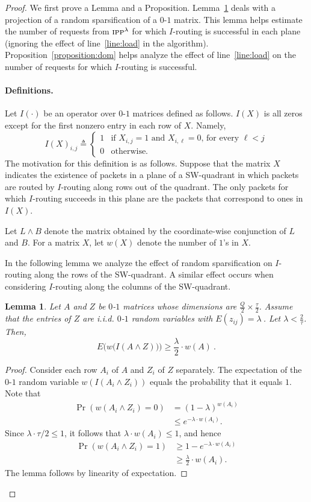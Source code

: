 \documentclass[11pt]{article}
\newtheorem{lemma}[theorem]{Lemma}
\newcommand{\eqdf}{\triangleq}
\newenvironment{proof sketch}[1]{\noindent {\emph{Proof sketch of #1:}}}{\hfill \qed}
\newcommand{\hl}{\tau}
\newcommand{\vl}{Q}
\begin{document}
\begin{proof}
  We first prove a Lemma and a Proposition. Lemma~\ref{lemma:sparse} deals with a
  projection of a random sparsification of a $0$-$1$ matrix. This
  lemma helps estimate the number of requests from $\text{\sc{ipp}}^{\lambda}$ for which
  $I$-routing is successful in each plane (ignoring the effect of
  line~\ref{line:load} in the algorithm).
Proposition~\ref{proposition:dom} helps analyze the effect of
  line~\ref{line:load} on the number of requests for which
  $I$-routing is successful.

\paragraph{Definitions.}

Let $I(\cdot)$ be an operator over $0$-$1$ matrices defined as follows. $I(X)$ is all
zeros except for the first nonzero entry in each row of $X$. Namely,
\[
I(X)_{i,j} \eqdf
\begin{cases}
  1 &\text{if $X_{i,j}=1$ and $X_{i,\ell}=0$, for every $\ell<j$}\\
0&\text{otherwise.}
\end{cases}
\]
The motivation for this definition is as follows. Suppose
that the matrix $X$ indicates the existence of packets in a
plane of a SW-quadrant in which packets are routed by
$I$-routing along rows out of the quadrant. The only
packets for which $I$-routing succeeds in this plane are
the packets that correspond to ones in $I(X)$.

Let $L\wedge B$ denote the matrix obtained by the coordinate-wise
conjunction of $L$ and $B$. For a matrix $X$, let $w(X)$ denote the number of
$1$'s in $X$.

In the following lemma we analyze the effect of random sparsification on $I$-routing along the rows of the SW-quadrant.
A similar effect occurs when considering $I$-routing along the columns of the SW-quadrant.
\begin{lemma}\label{lemma:sparse}
  Let $A$ and $Z$ be $0$-$1$ matrices whose dimensions are $\frac{\vl}{2} \times \frac{\hl}{2}$. Assume that the entries of $Z$ are i.i.d. $0$-$1$
  random variables with $E(z_{ij})=\lambda\:$.  Let $\lambda < \frac
  {2}{\hl}$. Then,
  $$E\Big(w\big(I(A \wedge Z)\big)\Big) \geq \frac{\lambda}{2} \cdot w(A)\:.$$
\end{lemma}
\begin{proof}
  Consider each row $A_i$ of $A$ and $Z_i$ of $Z$ separately.  The expectation of the
  $0$-$1$ random variable $w(I(A_i \wedge Z_i))$ equals the probability that it equals $1$.
  Note that
\begin{align*}
  \Pr(w(A_i\wedge Z_i)=0)&=(1-\lambda)^{w(A_i)}\\
&\leq e^{-\lambda \cdot w(A_i)}.
\end{align*}
Since $\lambda \cdot \tau/2 \leq 1$, it follows that $\lambda \cdot w(A_i)\leq 1$,
and hence
\begin{align*}
  \Pr(w(A_i\wedge Z_i)=1)&\geq 1- e^{-\lambda \cdot w(A_i)}\\
&\geq \frac{\lambda}{2} \cdot w(A_i).
\end{align*}
The lemma follows by linearity of expectation.
\end{proof}


\end{proof}
\end{document}
